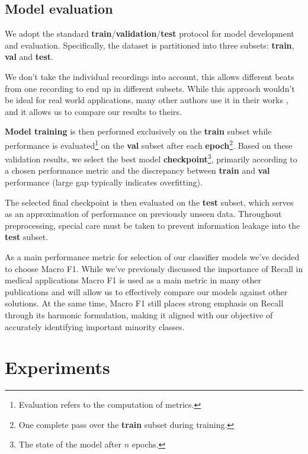 \subsection{Model evaluation}

We adopt the standard \textbf{train}/\textbf{validation}/\textbf{test} protocol for model development and evaluation.
Specifically, the dataset is partitioned into three subsets: \textbf{train}, \textbf{val} and \textbf{test}.

We don't take the individual recordings into account, this allows different beats from one recording to end up in different subsets.
While this approach wouldn't be ideal for real world applications, many other authors use it in their works \parencite{Hu2022, ECGformer}, and it allows us to compare our results to theirs.

\textbf{Model training} is then performed exclusively on the \textbf{train} subset while performance is evaluated\footnote{Evaluation refers to the computation of metrics.} on the \textbf{val} subset after each \textbf{epoch}\footnote{One complete pass over the \textbf{train} subset during training.}.
Based on these validation results, we select the best model \textbf{checkpoint}\footnote{The state of the model after \(n\) epochs.}, primarily according to a chosen performance metric and the discrepancy between \textbf{train} and \textbf{val} performance (large gap typically indicates overfitting).

The selected final checkpoint is then evaluated on the \textbf{test} subset, which serves as an approximation of performance on previously unseen data.
Throughout preprocessing, special care must be taken to prevent information leakage into the \textbf{test} subset.

As a main performance metric for selection of our classifier models we've decided to choose Macro F1.
While we've previously discussed the importance of Recall in medical applications Macro F1 is used as a main metric in many other publications \parencite{Hu2022} and will allow us to effectively compare our models against other solutions.
At the same time, Macro F1 still places strong emphasis on Recall through its harmonic formulation, making it aligned with our objective of accurately identifying important minority classes.


\section{Experiments}

